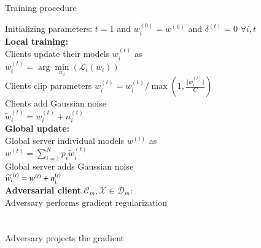 \begin{algorithm}[t!]
\caption{Training procedure}
\label{alg:NbAFL}
\LinesNumbered
{}
{Initializing parameters: $t = 1$ and ${w}^{(0)}_{i} = {w}^{(0)}$ and ${{\mathcal{\delta}}^{(t)}=0}$} $\forall i,t$\\
{
\textbf{Local training:}\\
{
Clients update their models ${w}^{(t)}_{i}$ as\\
\quad${w}^{(t)}_{i}=\arg\min\limits_{{w}_{i}}{\left(\mathcal{L}_{i}({w}_{i})\right)}$\\
Clients clip parameters ${w}^{(t)}_{i} = {w}^{(t)}_{i}/\max\left(1,\frac{\Vert{w}^{(t)}_{i}\Vert}{C}\right)$\\
Clients add Gaussian noise\\ $\widetilde{{w}}^{(t)}_{i}={w}^{(t)}_{i}+{n}^{(t)}_{i}$\\
}
\textbf{Global update:}\\
Global server individual models ${w}^{(t)}$ as\\
\quad\quad ${w}^{(t)} = \sum\limits_{i=1}^{N}{p_{i}\widetilde{{w}}^{(t)}_{i}}$\\
Global server adds Gaussian noise \\
\quad\quad$\widetilde{{w}_{i}}^{(t)}={w}^{(t)}+{n}_{\text i}^{(t)}$\\
    {
  \textbf{Adversarial client} $\mathcal C_{m},   \mathcal X \in \mathcal D_m:$
\\Adversary performs gradient regularization \\
\\
\\Adversary projects the gradient \\

}}
\end{algorithm}
